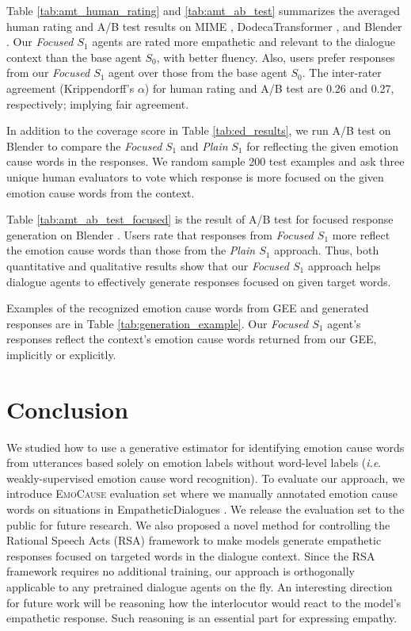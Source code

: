 \documentclass[11pt]{article}
\makeatletter
\DeclareRobustCommand\onedot{\futurelet\@let@token\@onedot}
\def\onedot{. }
\def\ie{\emph{i.e}\onedot} \def\Ie{\emph{I.e}\onedot}
\makeatother
\begin{document}
Table \ref{tab:amt_human_rating} and \ref{tab:amt_ab_test} summarizes the averaged human rating and A/B test results on MIME \citep{Majumder:2020:EMNLP}, DodecaTransformer \citep{Shuster:2020:ACL}, and Blender \citep{Roller:2021:EACL}.
Our \textit{Focused $S_1$} agents are rated more empathetic and relevant to the dialogue context than the base agent $S_0$, with better fluency.
Also, users prefer responses from our \textit{Focused $S_1$} agent over those from the base agent $S_0$.
The inter-rater agreement (Krippendorff's $\alpha$) for human rating and A/B test are 0.26 and 0.27, respectively; implying fair agreement.

In addition to the coverage score in Table \ref{tab:ed_results}, we run A/B test on Blender \citep{Roller:2021:EACL} to compare the \textit{Focused} $S_1$ and \textit{Plain} $S_1$ for reflecting the given emotion cause words in the responses.
We random sample 200 test examples and ask three unique human evaluators to vote which response is more focused on the given emotion cause words from the context.

Table \ref{tab:amt_ab_test_focused} is the result of A/B test for focused response generation on Blender \citep{Roller:2021:EACL}.
Users rate that responses from \textit{Focused $S_1$} more reflect the emotion cause words than those from the \textit{Plain $S_1$} approach.
Thus, both quantitative and qualitative results show that our \textit{Focused $S_1$} approach helps dialogue agents to effectively generate responses focused on given target words.

Examples of the recognized emotion cause words from GEE and generated responses are in Table \ref{tab:generation_example}.
Our \textit{Focused $S_1$} agent's responses reflect the context's emotion cause words returned from our GEE, implicitly or explicitly.





\section{Conclusion}

We studied how to use a generative estimator for identifying emotion cause words from utterances based solely on emotion labels without word-level labels (\ie weakly-supervised emotion cause word recognition).
To evaluate our approach, we introduce \textsc{EmoCause} evaluation set where we manually annotated emotion cause words on situations in EmpatheticDialogues \citep{Rashkin:2019:ACL}.
We release the evaluation set to the public for future research.
We also proposed a novel method for controlling the Rational Speech Acts (RSA) framework \citep{Frank:2012:Science} to make models generate empathetic responses focused on targeted words in the dialogue context.
Since the RSA framework requires no additional training, our approach is orthogonally applicable to any pretrained dialogue agents on the fly.
An interesting direction for future work will be reasoning how the interlocutor would react to the model's empathetic response.
Such reasoning is an essential part for expressing empathy.
\end{document}
